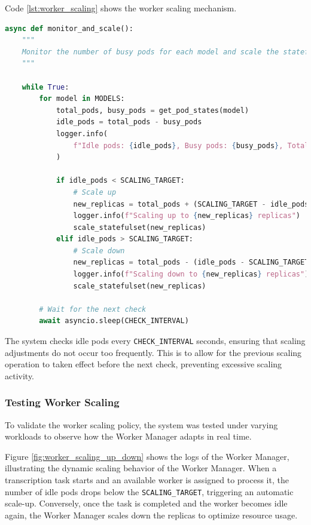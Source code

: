 Code \ref{lst:worker_scaling} shows the worker scaling mechanism.

\begin{lstlisting}[language=python, caption={Worker Scaling Policy}, label={lst:worker_scaling}]
async def monitor_and_scale():
    """
    Monitor the number of busy pods for each model and scale the statefulset up or down based on the number of idle pods.
    """

    while True:
        for model in MODELS:
            total_pods, busy_pods = get_pod_states(model)
            idle_pods = total_pods - busy_pods
            logger.info(
                f"Idle pods: {idle_pods}, Busy pods: {busy_pods}, Total pods: {total_pods}"
            )

            if idle_pods < SCALING_TARGET:
                # Scale up
                new_replicas = total_pods + (SCALING_TARGET - idle_pods)
                logger.info(f"Scaling up to {new_replicas} replicas")
                scale_statefulset(new_replicas)
            elif idle_pods > SCALING_TARGET:
                # Scale down
                new_replicas = total_pods - (idle_pods - SCALING_TARGET)
                logger.info(f"Scaling down to {new_replicas} replicas")
                scale_statefulset(new_replicas)

        # Wait for the next check
        await asyncio.sleep(CHECK_INTERVAL)
\end{lstlisting}

The system checks idle pods every \texttt{CHECK\_INTERVAL} seconds, ensuring that scaling adjustments do not occur too frequently. This is to allow for the previous scaling operation to taken effect before the next check, preventing excessive scaling activity.

\subsubsection{Testing Worker Scaling}
To validate the worker scaling policy, the system was tested under varying workloads to observe how the Worker Manager adapts in real time.

Figure \ref{fig:worker_scaling_up_down} shows the logs of the Worker Manager, illustrating the dynamic scaling behavior of the Worker Manager. When a transcription task starts and an available worker is assigned to process it, the number of idle pods drops below the \texttt{SCALING\_TARGET}, triggering an automatic scale-up. Conversely, once the task is completed and the worker becomes idle again, the Worker Manager scales down the replicas to optimize resource usage.


